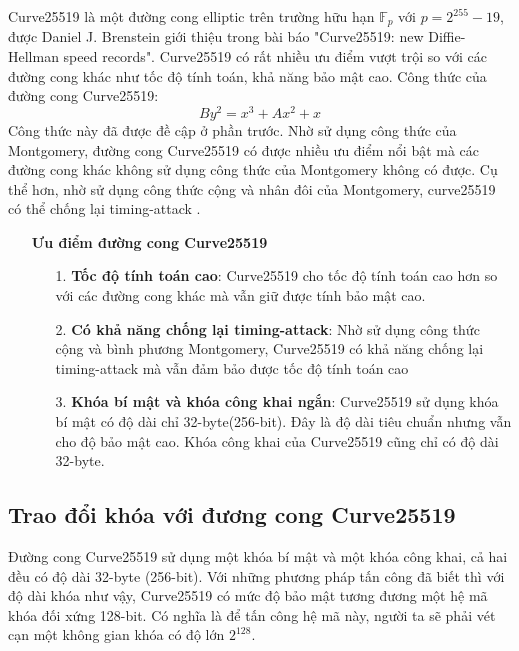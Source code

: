 \documentclass[a4paper,12pt]{report}
\begin{document}
Curve25519 là một đường cong elliptic trên trường hữu hạn $\mathbb{F}_p$ với $p = 2^{255} - 19$, được Daniel J. Brenstein giới thiệu trong bài báo "Curve25519: new Diffie-Hellman speed records". Curve25519 có rất nhiều ưu điểm vượt trội so với các đường cong khác như tốc độ tính toán,
khả năng bảo mật cao. Công thức của đường cong Curve25519:
\begin{displaymath}
By^2 = x^3 + Ax^2 + x
\end{displaymath}
Công thức này đã được đề cập ở phần trước. Nhờ sử dụng công thức của Montgomery, đường cong Curve25519 có được nhiều ưu điểm nổi bật mà các đường cong khác không sử dụng công thức của Montgomery không có được. Cụ thể hơn, nhờ sử dụng công thức cộng và nhân đôi của Montgomery, curve25519 có thể chống lại timing-attack .
\begin{itemize}
\item[] \textbf{Ưu điểm đường cong Curve25519}
\begin{itemize}
\item[1. ] \textbf{Tốc độ tính toán cao}: Curve25519 cho tốc độ tính toán cao hơn so với các đường cong khác mà vẫn giữ được tính bảo mật cao.
\item[2. ] \textbf{Có khả năng chống lại timing-attack}: Nhờ sử dụng công thức cộng và bình phương Montgomery, Curve25519 có khả năng chống lại timing-attack mà vẫn đảm bảo được tốc độ tính toán cao
\item[3. ] \textbf{Khóa bí mật và khóa công khai ngắn}: Curve25519 sử dụng khóa bí mật có độ dài chỉ 32-byte(256-bit). Đây là độ dài tiêu chuẩn nhưng vẫn cho độ bảo mật cao. Khóa công khai của Curve25519 cũng chỉ có độ dài 32-byte.
\end{itemize}
\end{itemize}
\subsection{Trao đổi khóa với đương cong Curve25519}
Đường cong Curve25519 sử dụng một khóa bí mật và một khóa công khai, cả hai đều có độ dài 32-byte (256-bit). Với những phương pháp tấn công đã biết thì với độ dài khóa như vậy, Curve25519 có mức độ bảo mật tương đương một hệ mã khóa đối xứng 128-bit. Có nghĩa là để tấn công hệ mã này, người ta sẽ phải vét cạn một không gian khóa có độ lớn $2^{128}$.
\end{document}
